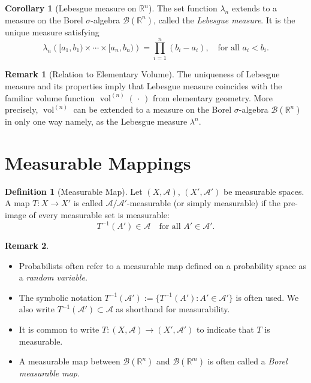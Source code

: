 \documentclass[12pt]{article}
\theoremstyle{definition}
\newtheorem{definition}{Definition}[section]
\newtheorem{corollary}{Corollary}[theorem]
\newtheorem{remark}{Remark}[section]
\begin{document}
\medskip
\begin{corollary}[Lebesgue measure on \( \mathbb{R}^n \)]
The set function \( \lambda_n \) extends to a measure on the Borel \( \sigma \)-algebra \( \mathcal{B}(\mathbb{R}^n) \), called the \emph{Lebesgue measure}. It is the unique measure satisfying
\[
\lambda_n\left( [a_1, b_1) \times \cdots \times [a_n, b_n) \right) = \prod_{i=1}^n (b_i - a_i), \quad \text{for all } a_i < b_i.
\]
\end{corollary}

\medskip
\begin{remark}[Relation to Elementary Volume]\label{rem:volume-uniqueness}
The uniqueness of Lebesgue measure and its properties imply that Lebesgue measure coincides with the familiar volume function \( \operatorname{vol}^{(n)}(\,\cdot\,) \) from elementary geometry. More precisely, \( \operatorname{vol}^{(n)} \) can be extended to a measure on the Borel \( \sigma \)-algebra \( \mathcal{B}(\mathbb{R}^n) \) in only one way namely, as the Lebesgue measure \( \lambda^n \).
\end{remark}




\vspace{3em}
\section{Measurable Mappings}

\medskip
\begin{definition}[Measurable Map]
Let \( (X, \mathcal{A}) \), \( (X', \mathcal{A}') \) be measurable spaces. A map \( T : X \to X' \) is called \(\mathcal{A}/\mathcal{A}'\)-measurable (or simply measurable) if the pre-image of every measurable set is measurable:
\[
T^{-1}(A') \in \mathcal{A} \quad \text{for all } A' \in \mathcal{A}'.
\]
\end{definition}

\begin{remark}
\leavevmode
\begin{itemize}
    \item Probabilists often refer to a measurable map defined on a probability space as a \emph{random variable}.
    \item The symbolic notation \( T^{-1}(\mathcal{A}') := \{ T^{-1}(A') : A' \in \mathcal{A}' \} \) is often used. We also write \( T^{-1}(\mathcal{A}') \subset \mathcal{A} \) as shorthand for measurability.
    \item It is common to write \( T : (X, \mathcal{A}) \to (X', \mathcal{A}') \) to indicate that \( T \) is measurable.
    \item A measurable map between \( \mathcal{B}(\mathbb{R}^n) \) and \( \mathcal{B}(\mathbb{R}^m) \) is often called a \emph{Borel measurable map}.
\end{itemize}
\end{remark}
\end{document}
